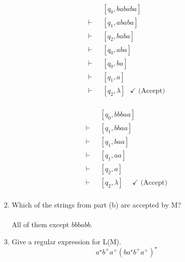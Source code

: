 \documentclass[12pt]{article}
\begin{document}
\begin{enumerate}
\begin{enumerate}
\begin{minipage}[t]{0.22\textwidth}
\begin{align*}
        \end{align*}
      \end{minipage}
      \begin{minipage}[t]{0.22\textwidth}
        \begin{align*}
          &\text{ }[q_0,bababa] \\
        \vdash &\text{ }[q_1,ababa] \\
          \vdash &\text{ }[q_2,baba] \\
          \vdash &\text{ }[q_0,aba] \\
          \vdash &\text{ }[q_0,ba] \\
          \vdash &\text{ }[q_1,a] \\
          \vdash &\text{ }[q_2,\lambda] \text{ } \checkmark \text{ (Accept)} \\
        \end{align*}
      \end{minipage}
      \begin{minipage}[t]{0.22\textwidth}
        \begin{align*}
          &\text{ }[q_0,bbbaa] \\
          \vdash &\text{ }[q_1,bbaa] \\
          \vdash &\text{ }[q_1,baa] \\
          \vdash &\text{ }[q_1,aa] \\
          \vdash &\text{ }[q_2,a] \\
          \vdash &\text{ }[q_2,\lambda] \text{ } \text{ } \checkmark \text{ (Accept)} \\
        \end{align*}
      \end{minipage}
  \newpage
\item Which of the strings from part (b) are accepted by M?
  \\ \\  All of them except $bbbabb$.\\
\item Give a regular expression for L(M).
  \[a^{\star}b^+a^+(ba^{\star}b^+a^+)^{\star} \]
  \end{enumerate}


\end{enumerate}
\end{document}
